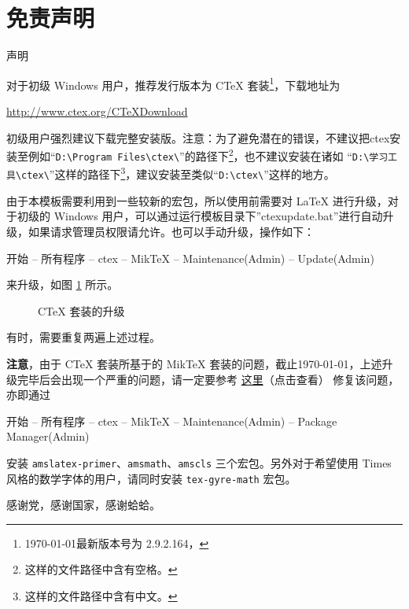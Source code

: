 \documentclass[%
               amsthm,
              ]{xjtubsc}
\begin{document}
\section{免责声明}
声明

\backmatter

\nocite{*}



\label{append:install}

对于初级 Windows 用户，推荐发行版本为 C\TeX{} 套装\footnote{\today 最新版本号为 2.9.2.164，}，下载地址为
\begin{center}
\url{http://www.ctex.org/CTeXDownload}
\end{center}
初级用户强烈建议下载完整安装版。注意：为了避免潜在的错误，不建议把ctex安装至例如“\verb|D:\Program Files\ctex\|”的路径下\footnote{这样的文件路径中含有空格。}，也不建议安装在诸如 “\verb|D:\学习工具\ctex\|”这样的路径下\footnote{这样的文件路径中含有中文。}，建议安装至类似“\verb|D:\ctex\|”这样的地方。

由于本模板需要利用到一些较新的宏包，所以使用前需要对 LaTeX 进行升级，对于初级的 Windows 用户，可以通过运行模板目录下''ctexupdate.bat''进行自动升级，如果请求管理员权限请允许。也可以手动升级，操作如下：
\begin{center}
开始 -- 所有程序 -- ctex -- MikTeX -- Maintenance(Admin) -- Update(Admin)
\end{center}
来升级，如图 \ref{fig:update} 所示。
\begin{figure}[h]
\centering
{}\quad
{}
\caption{C\TeX{} 套装的升级}\label{fig:update}
\end{figure}
有时，需要重复两遍上述过程。

{\color{red}\textbf{注意}}，由于 C\TeX{} 套装所基于的 MikTeX 套装的问题，截止\today，上述升级完毕后会出现一个严重的问题，请一定要参考 \href{http://tex.stackexchange.com/questions/96778/a-miktex-update-removed-amsmath-as-obsolete-can-i-use-another-package-or-get-i/96795#96795}{这里}（点击查看）
修复该问题，亦即通过
\begin{center}
开始 -- 所有程序 -- ctex -- MikTeX -- Maintenance(Admin) -- Package Manager(Admin)
\end{center}
安装 \verb|amslatex-primer|、\verb|amsmath|、\verb|amscls| 三个宏包。另外对于希望使用 Times 风格的数学字体的用户，请同时安装 \verb|tex-gyre-math| 宏包。




\begin{acknowledgment}
感谢党，感谢国家，感谢蛤蛤。
\end{acknowledgment}
\end{document}
